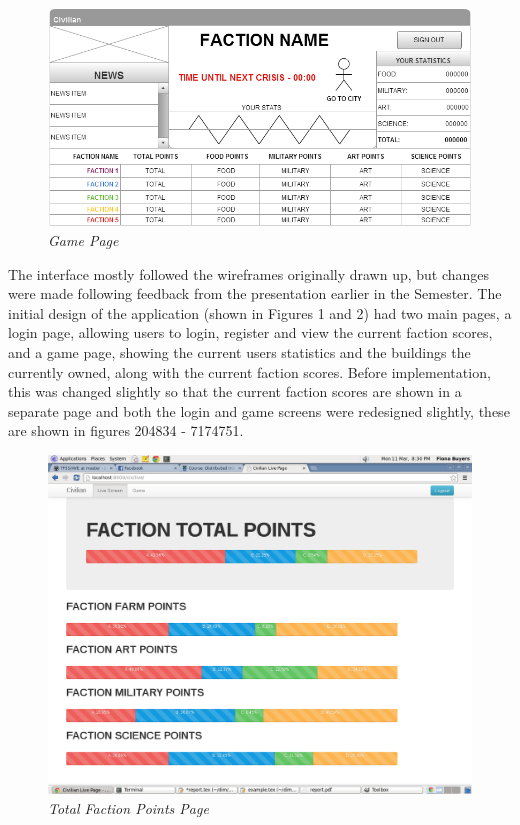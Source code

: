 \documentclass{sig-alt-release2}
\begin{document}
\begin{figure}[!htbp]
  \caption{\textit{Game Page}}
  \begin{center}
		\includegraphics[scale=0.25]{img/w4.png}
  \end{center}
\end{figure}

The interface mostly followed the wireframes originally drawn up, but changes were made following feedback from the presentation earlier in the Semester. The initial design of the application (shown in Figures 1 and 2) had two main pages, a login page, allowing users to login, register and view the current faction scores, and a game page, showing the current users statistics and the buildings the currently owned, along with the current faction scores. Before implementation, this was changed slightly so that the current faction scores are shown in a separate page and both the login and game screens were redesigned slightly, these are shown in figures 204834 - 7174751.\\

\begin{figure}[!htbp]
  \caption{\textit{Total Faction Points Page}}
  \begin{center}
		\includegraphics[scale=0.15]{img/faction.png}
  \end{center}
\end{figure}
\end{document}
